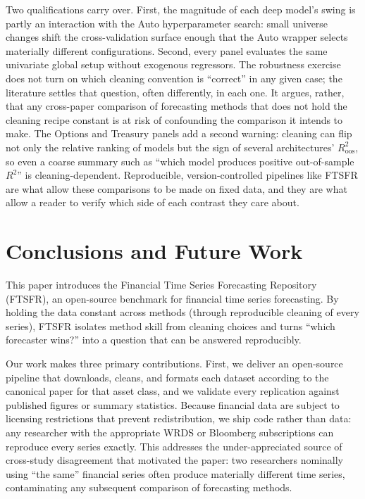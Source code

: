 \documentclass{article}
\begin{document}
Two qualifications carry over. First, the magnitude of each deep model's swing is partly an interaction with the Auto hyperparameter search: small universe changes shift the cross-validation surface enough that the Auto wrapper selects materially different configurations. Second, every panel evaluates the same univariate global setup without exogenous regressors. The robustness exercise does not turn on which cleaning convention is ``correct'' in any given case; the literature settles that question, often differently, in each one. It argues, rather, that any cross-paper comparison of forecasting methods that does not hold the cleaning recipe constant is at risk of confounding the comparison it intends to make. The Options and Treasury panels add a second warning: cleaning can flip not only the relative ranking of models but the sign of several architectures' $R^2_{\text{oos}}$, so even a coarse summary such as ``which model produces positive out-of-sample $R^2$'' is cleaning-dependent. Reproducible, version-controlled pipelines like FTSFR are what allow these comparisons to be made on fixed data, and they are what allow a reader to verify which side of each contrast they care about.

\section{Conclusions and Future Work}
\label{sec:conclusion}

This paper introduces the Financial Time Series Forecasting Repository (FTSFR), an open-source benchmark for financial time series forecasting. By holding the data constant across methods (through reproducible cleaning of every series), FTSFR isolates method skill from cleaning choices and turns ``which forecaster wins?'' into a question that can be answered reproducibly.

Our work makes three primary contributions. First, we deliver an open-source pipeline that downloads, cleans, and formats each dataset according to the canonical paper for that asset class, and we validate every replication against published figures or summary statistics. Because financial data are subject to licensing restrictions that prevent redistribution, we ship code rather than data: any researcher with the appropriate WRDS or Bloomberg subscriptions can reproduce every series exactly. This addresses the under-appreciated source of cross-study disagreement that motivated the paper: two researchers nominally using ``the same'' financial series often produce materially different time series, contaminating any subsequent comparison of forecasting methods.
\end{document}
